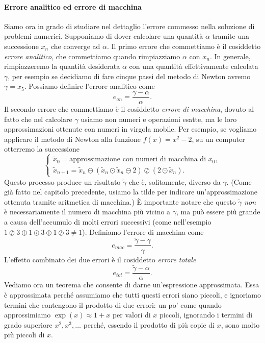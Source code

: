 \documentclass[a4paper]{report}
\theoremstyle{definiton}
\theoremstyle{remark}
\begin{document}
\paragraph{Errore analitico ed errore di macchina} Siamo ora in grado di studiare nel dettaglio l'errore commesso nella soluzione di problemi numerici. Supponiamo di dover calcolare una quantità $\alpha$ tramite una successione $x_n$ che converge ad $\alpha$. Il primo errore che commettiamo è il cosiddetto \emph{errore analitico}, che commettiamo quando rimpiazziamo $\alpha$ con $x_n$. In generale, rimpiazzeremo la quantità desiderata $\alpha$ con una quantità effettivamente calcolata $\gamma$, per esempio se decidiamo di fare cinque passi del metodo di Newton avremo $\gamma=x_5$. Possiamo definire l'errore analitico come
\begin{equation} \label{ean}
    e_{an} = \frac{\gamma - \alpha}{\alpha}.    
\end{equation}
Il secondo errore che commettiamo è il cosiddetto \emph{errore di macchina}, dovuto al fatto che nel calcolare $\gamma$ usiamo non numeri e operazioni esatte, ma le loro approssimazioni ottenute con numeri in virgola mobile. Per esempio, se vogliamo applicare il metodo di Newton alla funzione $f(x) = x^2 - 2$, su un computer otterremo la successione
\[
\begin{cases}
    \tilde{x}_0 = \text{approssimazione con numeri di macchina di $x_0$},\\
    \tilde{x}_{n+1} = \tilde{x}_n \ominus (\tilde{x}_n\odot \tilde{x}_n \ominus 2) \oslash (2\odot \tilde{x}_n).
\end{cases}
\]
Questo processo produce un risultato $\tilde{\gamma}$ che è, solitamente, diverso da $\gamma$. (Come già fatto nel capitolo precedente, usiamo la tilde per indicare un'approssimazione ottenuta tramite aritmetica di macchina.) È importante notare che questo $\tilde{\gamma}$ \emph{non} è necessariamente il numero di macchina più vicino a $\gamma$, ma può essere più grande a causa dell'accumulo di molti errori successivi (come nell'esempio $1\oslash 3 \oplus 1\oslash 3 \oplus 1\oslash 3 \neq 1$). Definiamo l'errore di macchina come
\[
e_{mac} = \frac{\tilde{\gamma} - \gamma}{\gamma}.
\]
L'effetto combinato dei due errori è il cosiddetto \emph{errore totale}
\[
e_{tot} = \frac{\tilde{\gamma} - \alpha}{\alpha}.
\]
Vediamo ora un teorema che consente di darne un'espressione approssimata. Essa è approssimata perché assumiamo che tutti questi errori siano piccoli, e ignoriamo termini che contengono il prodotto di due errori: un po' come quando approssimiamo $\exp(x) \approx 1 + x$ per valori di $x$ piccoli, ignorando i termini di grado superiore $x^2, x^3, \dots$ perché, essendo il prodotto di più copie di $x$, sono molto più piccoli di $x$.
\end{document}

